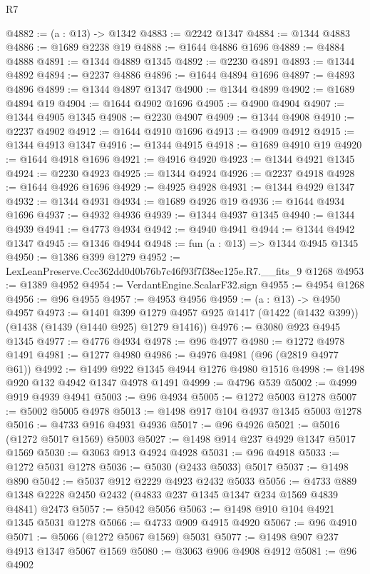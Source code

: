 \begin{lexlean}{R7}
\begin{coremodule}
@4882 := (a : @13) -> @1342
@4883 := @2242 @1347
@4884 := @1344 @4883
@4886 := @1689 @2238 @19
@4888 := @1644 @4886 @1696
@4889 := @4884 @4888
@4891 := @1344 @4889 @1345
@4892 := @2230 @4891
@4893 := @1344 @4892
@4894 := @2237 @4886
@4896 := @1644 @4894 @1696
@4897 := @4893 @4896
@4899 := @1344 @4897 @1347
@4900 := @1344 @4899
@4902 := @1689 @4894 @19
@4904 := @1644 @4902 @1696
@4905 := @4900 @4904
@4907 := @1344 @4905 @1345
@4908 := @2230 @4907
@4909 := @1344 @4908
@4910 := @2237 @4902
@4912 := @1644 @4910 @1696
@4913 := @4909 @4912
@4915 := @1344 @4913 @1347
@4916 := @1344 @4915
@4918 := @1689 @4910 @19
@4920 := @1644 @4918 @1696
@4921 := @4916 @4920
@4923 := @1344 @4921 @1345
@4924 := @2230 @4923
@4925 := @1344 @4924
@4926 := @2237 @4918
@4928 := @1644 @4926 @1696
@4929 := @4925 @4928
@4931 := @1344 @4929 @1347
@4932 := @1344 @4931
@4934 := @1689 @4926 @19
@4936 := @1644 @4934 @1696
@4937 := @4932 @4936
@4939 := @1344 @4937 @1345
@4940 := @1344 @4939
@4941 := @4773 @4934
@4942 := @4940 @4941
@4944 := @1344 @4942 @1347
@4945 := @1346 @4944
@4948 := fun (a : @13) => @1344 @4945 @1345
@4950 := @1386 @399 @1279
@4952 := LexLeanPreserve.Ccc362dd0d0b76b7c46f93f7f38ec125e.R7.__fits_9 @1268
@4953 := @1389 @4952
@4954 := VerdantEngine.ScalarF32.sign
@4955 := @4954 @1268
@4956 := @96 @4955
@4957 := @4953 @4956
@4959 := (a : @13) -> @4950 @4957
@4973 := @1401
    @399
    @1279
    @4957
    @925
    @1417
    (@1422 (@1432 @399))
    (@1438 (@1439 (@1440 @925) @1279 @1416))
@4976 := @3080 @923 @4945 @1345
@4977 := @4776 @4934
@4978 := @96 @4977
@4980 := @1272 @4978 @1491
@4981 := @1277 @4980
@4986 := @4976 @4981 (@96 (@2819 @4977 @61))
@4992 := @1499 @922 @1345 @4944 @1276 @4980 @1516
@4998 := @1498 @920 @132 @4942 @1347 @4978 @1491
@4999 := @4796 @539
@5002 := @4999 @919 @4939 @4941
@5003 := @96 @4934
@5005 := @1272 @5003 @1278
@5007 := @5002 @5005 @4978
@5013 := @1498 @917 @104 @4937 @1345 @5003 @1278
@5016 := @4733 @916 @4931 @4936
@5017 := @96 @4926
@5021 := @5016 (@1272 @5017 @1569) @5003
@5027 := @1498 @914 @237 @4929 @1347 @5017 @1569
@5030 := @3063 @913 @4924 @4928
@5031 := @96 @4918
@5033 := @1272 @5031 @1278
@5036 := @5030 (@2433 @5033) @5017
@5037 := @1498 @890
@5042 := @5037 @912 @2229 @4923 @2432 @5033
@5056 := @4733 @889 @1348 @2228 @2450 @2432 (@4833 @237 @1345 @1347 @234 @1569 @4839 @4841) @2473
@5057 := @5042 @5056
@5063 := @1498 @910 @104 @4921 @1345 @5031 @1278
@5066 := @4733 @909 @4915 @4920
@5067 := @96 @4910
@5071 := @5066 (@1272 @5067 @1569) @5031
@5077 := @1498 @907 @237 @4913 @1347 @5067 @1569
@5080 := @3063 @906 @4908 @4912
@5081 := @96 @4902

\end{coremodule}
\end{lexlean}
